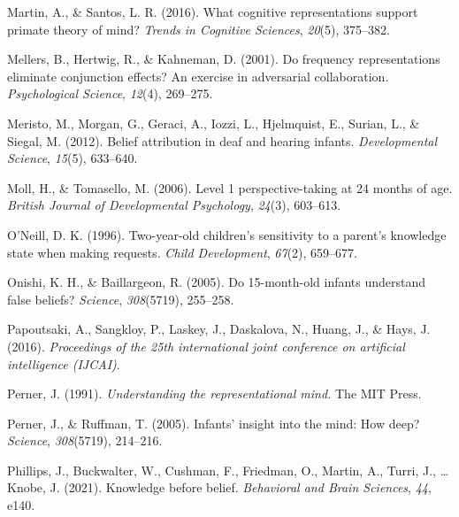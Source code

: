 \documentclass[
  english,
  man,floatsintext]{apa6}
\newlength{\cslhangindent}
\newlength{\cslentryspacingunit} %
\newenvironment{CSLReferences}[2] %
 {%
  \setlength{\parindent}{0pt}
  \ifodd #1
  \let\oldpar\par
  \def\par{\hangindent=\cslhangindent\oldpar}
  \fi
  \setlength{\parskip}{#2\cslentryspacingunit}
 }%
 {}
\begin{document}
\begin{CSLReferences}{1}{0}
\leavevmode{}%
Martin, A., \& Santos, L. R. (2016). What cognitive representations support primate theory of mind? \emph{Trends in Cognitive Sciences}, \emph{20}(5), 375--382.

\leavevmode{}%
Mellers, B., Hertwig, R., \& Kahneman, D. (2001). Do frequency representations eliminate conjunction effects? An exercise in adversarial collaboration. \emph{Psychological Science}, \emph{12}(4), 269--275.

\leavevmode{}%
Meristo, M., Morgan, G., Geraci, A., Iozzi, L., Hjelmquist, E., Surian, L., \& Siegal, M. (2012). Belief attribution in deaf and hearing infants. \emph{Developmental Science}, \emph{15}(5), 633--640.

\leavevmode{}%
Moll, H., \& Tomasello, M. (2006). Level 1 perspective-taking at 24 months of age. \emph{British Journal of Developmental Psychology}, \emph{24}(3), 603--613.

\leavevmode{}%
O'Neill, D. K. (1996). Two-year-old children's sensitivity to a parent's knowledge state when making requests. \emph{Child Development}, \emph{67}(2), 659--677.

\leavevmode{}%
Onishi, K. H., \& Baillargeon, R. (2005). Do 15-month-old infants understand false beliefs? \emph{Science}, \emph{308}(5719), 255--258.

\leavevmode{}%
Papoutsaki, A., Sangkloy, P., Laskey, J., Daskalova, N., Huang, J., \& Hays, J. (2016). \emph{Proceedings of the 25th international joint conference on artificial intelligence (IJCAI)}.

\leavevmode{}%
Perner, J. (1991). \emph{Understanding the representational mind.} The MIT Press.

\leavevmode{}%
Perner, J., \& Ruffman, T. (2005). Infants' insight into the mind: How deep? \emph{Science}, \emph{308}(5719), 214--216.

\leavevmode{}%
Phillips, J., Buckwalter, W., Cushman, F., Friedman, O., Martin, A., Turri, J., \ldots{} Knobe, J. (2021). Knowledge before belief. \emph{Behavioral and Brain Sciences}, \emph{44}, e140.


\end{CSLReferences}
\end{document}
